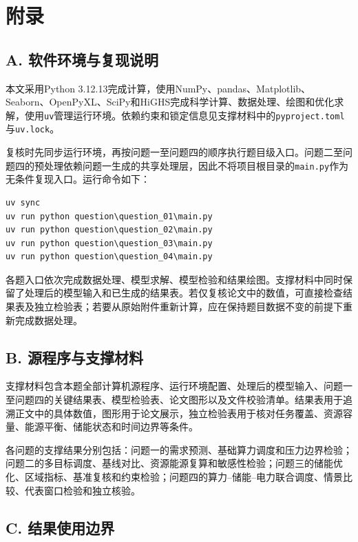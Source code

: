 \section*{附录}

\subsection*{A. 软件环境与复现说明}

本文采用Python 3.12.13完成计算，使用NumPy、pandas、Matplotlib、Seaborn、OpenPyXL、SciPy和HiGHS完成科学计算、数据处理、绘图和优化求解，使用\texttt{uv}管理运行环境。依赖约束和锁定信息见支撑材料中的\texttt{pyproject.toml}与\texttt{uv.lock}。

复核时先同步运行环境，再按问题一至问题四的顺序执行题目级入口。问题二至问题四的预处理依赖问题一生成的共享处理层，因此不将项目根目录的\texttt{main.py}作为无条件复现入口。运行命令如下：

\begin{lstlisting}[language={},basicstyle=\ttfamily\small]
uv sync
uv run python question\question_01\main.py
uv run python question\question_02\main.py
uv run python question\question_03\main.py
uv run python question\question_04\main.py
\end{lstlisting}

各题入口依次完成数据处理、模型求解、模型检验和结果绘图。支撑材料中同时保留了处理后的模型输入和已生成的结果表。若仅复核论文中的数值，可直接检查结果表及独立检验表；若要从原始附件重新计算，应在保持题目数据不变的前提下重新完成数据处理。

\subsection*{B. 源程序与支撑材料}

支撑材料包含本题全部计算机源程序、运行环境配置、处理后的模型输入、问题一至问题四的关键结果表、模型检验表、论文图形以及文件校验清单。结果表用于追溯正文中的具体数值，图形用于论文展示，独立检验表用于核对任务覆盖、资源容量、能源平衡、储能状态和时间边界等条件。

各问题的支撑结果分别包括：问题一的需求预测、基础算力调度和压力边界检验；问题二的多目标调度、基线对比、资源能源复算和敏感性检验；问题三的储能优化、区域指标、基准复核和约束检验；问题四的算力--储能--电力联合调度、情景比较、代表窗口检验和独立核验。

\subsection*{C. 结果使用边界}

